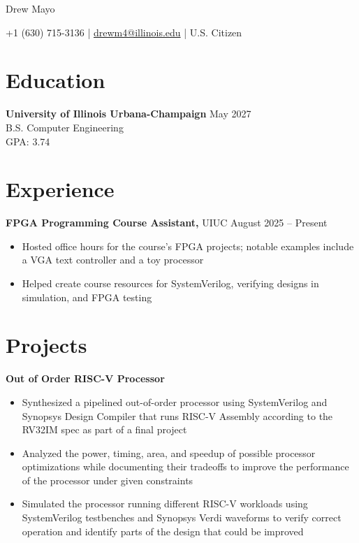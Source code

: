 \documentclass[11pt]{article} %
\begin{document}
\centerline{\Huge Drew Mayo}

\vspace{5pt}

\centerline{+1 (630) 715-3136 | \href{mailto:drewm4@illinois.edu}{drewm4@illinois.edu} | U.S. Citizen }

\vspace{-10pt}

\section*{Education}
\textbf{University of Illinois Urbana-Champaign} \hfill May 2027 \\ B.S. Computer Engineering \\
GPA: 3.74

\vspace{-6.5pt}

\section*{Experience}
\textbf{FPGA Programming Course Assistant,} {UIUC} \hfill August 2025 -- Present \\
\vspace{-9pt}
\begin{itemize}
    \item Hosted office hours for the course’s FPGA projects; notable examples include a VGA text controller and a toy processor
    \item Helped create course resources for SystemVerilog, verifying designs in simulation, and FPGA testing
\end{itemize}

\vspace{-18.5pt}

\section*{Projects}
\textbf{Out of Order RISC-V Processor} \\
\vspace{-9pt}
\begin{itemize}
  \item Synthesized a pipelined out-of-order processor using SystemVerilog and Synopsys Design Compiler that runs RISC-V Assembly according to the RV32IM spec as part of a final project
  \item Analyzed the power, timing, area, and speedup of possible processor optimizations while documenting their tradeoffs to improve the performance of the processor under given constraints
  \item Simulated the processor running different RISC-V workloads using SystemVerilog testbenches and Synopsys Verdi waveforms to verify correct operation and identify parts of the design that could be improved
\end{itemize} 
\end{document}
